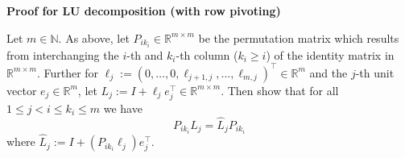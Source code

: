 \textbf{Proof for LU decomposition (with row pivoting)}

Let $m\in\mathbb{N}$.  As above, let $P_{ik_i} \in \mathbb{R}^{m \times m}$ be the permutation matrix which results from interchanging the $i$-th and $k_i$-th column ($k_i \geq i$) of the identity matrix in $\mathbb{R}^{m \times m}$. Further for $\ell_j := (0,\ldots,0,\ell_{j+1,j},\ldots,\ell_{m,j})^\top\in\mathbb{R}^m$ and the $j$-th unit vector $e_j\in\mathbb{R}^m$, let $L_j := I + \ell_je_j^\top \in \mathbb{R}^{m\times m}$.
Then show that for all $1 \leq j< i \leq k_i\leq m$ we have
$$P_{ik_i} L_j = \widehat{L}_j P_{ik_i}$$
where $\widehat{L}_j :=  I + (P_{ik_i}\ell_j)e_j^\top$.